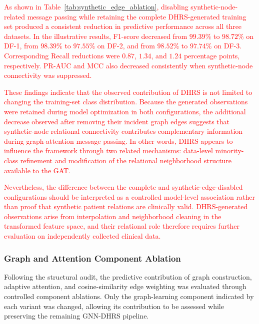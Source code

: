 \documentclass[pdflatex,sn-mathphys-num]{sn-jnl}%
\theoremstyle{thmstyleone}%
\theoremstyle{thmstyletwo}%
\theoremstyle{thmstylethree}%
\begin{document}
\textcolor{red}{
As shown in Table~\ref{tab:synthetic_edge_ablation}, disabling
synthetic-node-related message passing while retaining the complete
DHRS-generated training set produced a consistent reduction in predictive
performance across all three datasets. In the illustrative results, F1-score
decreased from \(99.39\%\) to \(98.72\%\) on DF-1, from \(98.39\%\) to
\(97.55\%\) on DF-2, and from \(98.52\%\) to \(97.74\%\) on DF-3.
Corresponding Recall reductions were \(0.87\), \(1.34\), and \(1.24\)
percentage points, respectively. PR-AUC and MCC also decreased consistently
when synthetic-node connectivity was suppressed.
}

\textcolor{red}{
These findings indicate that the observed contribution of DHRS is not limited
to changing the training-set class distribution. Because the generated
observations were retained during model optimization in both configurations,
the additional decrease observed after removing their incident graph edges
suggests that synthetic-node relational connectivity contributes
complementary information during graph-attention message passing. In other
words, DHRS appears to influence the framework through two related mechanisms:
data-level minority-class refinement and modification of the relational
neighborhood structure available to the GAT.
}

\textcolor{red}{
Nevertheless, the difference between the complete and
synthetic-edge-disabled configurations should be interpreted as a controlled
model-level association rather than proof that synthetic patient relations are
clinically valid. DHRS-generated observations arise from interpolation and
neighborhood cleaning in the transformed feature space, and their relational
role therefore requires further evaluation on independently collected
clinical data.
}
\subsubsection{Graph and Attention Component Ablation}
\label{subsubsec:graph_attention_ablation}

 {
Following the structural audit, the predictive contribution of graph
construction, adaptive attention, and cosine-similarity edge weighting was
evaluated through controlled component ablations. Only the graph-learning
component indicated by each variant was changed, allowing its contribution
to be assessed while preserving the remaining GNN-DHRS pipeline.
}
\end{document}
